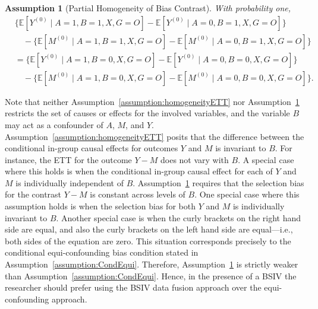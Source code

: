 \documentclass[10pt]{article}
\newtheorem{assumption}{Assumption}
\newcommand{\E}{\mathbb{E}}
\begin{document}
\begin{assumption}[Partial Homogeneity of Bias Contrast]
\label{assumption:homogeneityBias}
With probability one,
\begin{equation*}
\begin{aligned}
&\Big\{ \E[Y^{(0)} \mid A = 1, B = 1, X, G = O] - \E[Y^{(0)} \mid A = 0, B = 1, X, G = O] \Big\} \\
&\quad - \Big\{ \E[M^{(0)} \mid A = 1, B = 1, X, G = O] - \E[M^{(0)} \mid A = 0, B = 1, X, G = O] \Big\} \\
&= \Big\{ \E[Y^{(0)} \mid A = 1, B = 0, X, G = O] - \E[Y^{(0)} \mid A = 0, B = 0, X, G = O] \Big\} \\
&\quad - \Big\{ \E[M^{(0)} \mid A = 1, B = 0, X, G = O] - \E[M^{(0)} \mid A = 0, B = 0, X, G = O] \Big\}.
\end{aligned}
\end{equation*}
\end{assumption}
Note that neither Assumption~\ref{assumption:homogeneityETT} nor Assumption~\ref{assumption:homogeneityBias} restricts the set of causes or effects for the involved variables, and the variable \( B \) may act as a confounder of \( A \), \( M \), and \( Y \). 
Assumption~\ref{assumption:homogeneityETT} posits that the difference between the conditional in-group causal effects for outcomes \( Y \) and \( M \) is invariant to \( B \). For instance, the ETT for the outcome \( Y - M \) does not vary with \( B \). A special case where this holds is when the conditional in-group causal effect for each of \( Y \) and \( M \) is individually independent of \( B \). Assumption~\ref{assumption:homogeneityBias} requires that the selection bias for the contrast \( Y - M \) is constant across levels of \( B \). One special case where this assumption holds is when the selection bias for both \( Y \) and \( M \) is individually invariant to \( B \). Another special case is when the curly brackets on the right hand side are equal, and also the curly brackets on the left hand side are equal---i.e., both sides of the equation are zero. This situation corresponds precisely to the conditional equi-confounding bias condition stated in Assumption~\ref{assumption:CondEqui}. Therefore, Assumption~\ref{assumption:homogeneityBias} is strictly weaker than Assumption~\ref{assumption:CondEqui}. Hence, in the presence of a BSIV the researcher should prefer using the BSIV data fusion approach over the equi-confounding approach.
\end{document}
